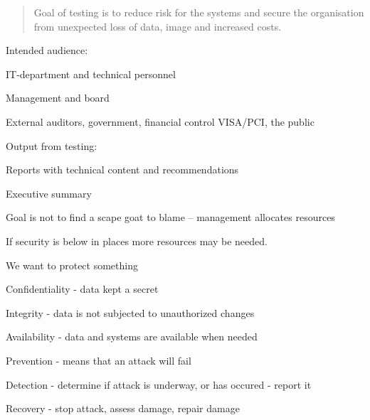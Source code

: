\documentclass[Screen16to9,17pt]{foils}
\begin{document}

\begin{quote}
Goal of testing is to reduce risk for the systems and secure the organisation\\ from unexpected loss of data, image and increased costs.
\end{quote}

\begin{list1}
\item Intended audience:
\begin{list2}
\item IT-department and technical personnel
\item Management and board
\item External auditors, government, financial control VISA/PCI, the public
\end{list2}
\item Output from testing:
\begin{list2}
\item Reports with technical content and recommendations
\item Executive summary
\end{list2}
\end{list1}

Goal is not to find a scape goat to blame -- management allocates resources

If security is below in places more resources may be needed.




\begin{list1}
\item We want to protect something
\item Confidentiality - data kept a secret
\item Integrity - data is not subjected to unauthorized changes
\item Availability - data and systems are available when needed
\end{list1}


\begin{list1}
\item Prevention - means that an attack will fail
\item Detection - determine if attack is underway, or has occured - report it
\item Recovery - stop attack, assess damage, repair damage
\end{list1}
\end{document}
